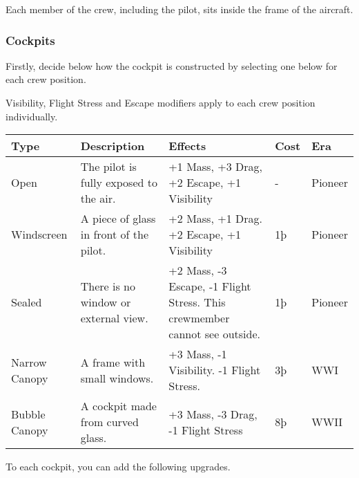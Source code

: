 \documentclass{article}
\begin{document}
Each member of the crew, including the pilot, sits inside the frame of
the aircraft.

\subsubsection{Cockpits}
\label{_Cockpits}

Firstly, decide below how the cockpit is constructed by selecting one
below for each crew position.

Visibility, Flight Stress and Escape modifiers apply to each crew
position individually.

\begin{tabular}{|l|l|l|l|l|}
  \hline
  Type                                               & Description                             & Effects                    & Cost & Era \\\hline
  Open                                               & The pilot is fully exposed to the air.  & +1 Mass, +3 Drag, +2
  Escape, +1 Visibility                              & -                                       & Pioneer                                 \\\hline
  Windscreen                                         & A piece of glass in front of the pilot. & +2 Mass, +1 Drag.
  +2 Escape, +1 Visibility                           & 1þ                                      & Pioneer                                 \\\hline
  Sealed                                             & There is no window or external view.    & +2 Mass, -3 Escape, -1
  Flight Stress. This crewmember cannot see outside. & 1þ                                      & Pioneer                                 \\\hline
  Narrow Canopy                                      & A frame with small windows.             & +3 Mass, -1 Visibility. -1
  Flight Stress.                                     & 3þ                                      & WWI                                     \\\hline
  Bubble Canopy                                      & A cockpit made from curved glass.       & +3 Mass, -3 Drag, -1
  Flight Stress                                      & 8þ                                      & WWII                                    \\\hline
\end{tabular}

To each cockpit, you can add the following upgrades.
\end{document}
